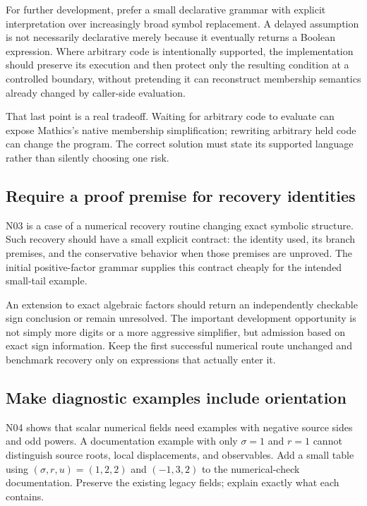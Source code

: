 \documentclass[11pt,letterpaper]{article}
\begin{document}
For further development, prefer a small declarative grammar with explicit interpretation over increasingly broad symbol replacement. A delayed assumption is not necessarily declarative merely because it eventually returns a Boolean expression. Where arbitrary code is intentionally supported, the implementation should preserve its execution and then protect only the resulting condition at a controlled boundary, without pretending it can reconstruct membership semantics already changed by caller-side evaluation.

That last point is a real tradeoff. Waiting for arbitrary code to evaluate can expose Mathics's native membership simplification; rewriting arbitrary held code can change the program. The correct solution must state its supported language rather than silently choosing one risk.

\subsection{Require a proof premise for recovery identities}

N03 is a case of a numerical recovery routine changing exact symbolic structure. Such recovery should have a small explicit contract: the identity used, its branch premises, and the conservative behavior when those premises are unproved. The initial positive-factor grammar supplies this contract cheaply for the intended small-tail example.

An extension to exact algebraic factors should return an independently checkable sign conclusion or remain unresolved. The important development opportunity is not simply more digits or a more aggressive simplifier, but admission based on exact sign information. Keep the first successful numerical route unchanged and benchmark recovery only on expressions that actually enter it.

\subsection{Make diagnostic examples include orientation}

N04 shows that scalar numerical fields need examples with negative source sides and odd powers. A documentation example with only $\sigma=1$ and $r=1$ cannot distinguish source roots, local displacements, and observables. Add a small table using $(\sigma,r,u)=(1,2,2)$ and $(-1,3,2)$ to the numerical-check documentation. Preserve the existing legacy fields; explain exactly what each contains.
\end{document}
